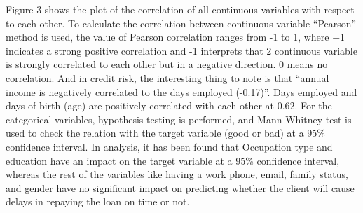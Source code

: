 \documentclass[10pt]{article}
\begin{document}
\begin{multicols}{2}
Figure 3 shows the plot of the correlation of all continuous variables with respect to each other. To calculate the correlation between continuous variable “Pearson” method is used, the value of Pearson correlation ranges from -1 to 1, where +1 indicates a strong positive correlation and -1 interprets that 2 continuous variable is strongly correlated to each other but in a negative direction. 0 means no correlation. And in credit risk, the interesting thing to note is that “annual income is negatively correlated to the days employed (-0.17)”. Days employed and days of birth (age) are positively correlated with each other at 0.62. For the categorical variables, hypothesis testing is performed, and Mann Whitney test is used to check the relation with the target variable (good or bad) at a 95\% confidence interval. In analysis, it has been found that Occupation type and education have an impact on the target variable at a 95\% confidence interval, whereas the rest of the variables like having a work phone, email, family status, and gender have no significant impact on predicting whether the client will cause delays in repaying the loan on time or not. 


\end{multicols}
\end{document}

